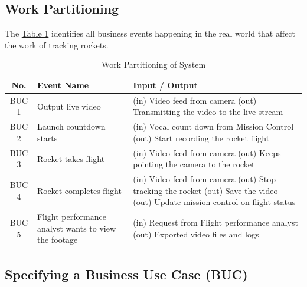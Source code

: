 \documentclass[12pt]{article}
\begin{document}
\subsection{Work Partitioning}

The \hyperref[tab:work-part]{Table 1} identifies all business events happening
in the real world that affect the work of tracking rockets.

\begin{table}[H]
  \centering
  \setlength\extrarowheight{5mm}
  \begin{tabularx}{\textwidth}{cp{1.5in}X}
    \toprule \textbf{No.} & \textbf{Event Name}                                  &
    \textbf{Input / Output}                                                        \\
    \midrule
    BUC 1                 & Output live video                                    &
    (in) Video feed from camera \newline
    (out) Transmitting the video to the live stream
    \\
    BUC 2                 & Launch countdown starts                              &
    (in) Vocal count down from Mission Control \newline
    (out) Start recording the rocket flight
    \\
    BUC 3                 & Rocket takes flight                                  &
    (in) Video feed from camera \newline
    (out) Keeps pointing the camera to the rocket
    \\
    BUC 4                 & Rocket completes flight                              &
    (in) Video feed from camera \newline
    (out) Stop tracking the rocket \newline
    (out) Save the video  \newline
    (out) Update mission control on flight status
    \\
    BUC 5                 & Flight performance analyst wants to view the footage &
    (in) Request from Flight performance analyst \newline
    (out) Exported video files and logs
    \\
    \bottomrule
  \end{tabularx}
  \caption{Work Partitioning of System}
  \label{tab:work-part}
\end{table}

\subsection{Specifying a Business Use Case (BUC)}
\end{document}
